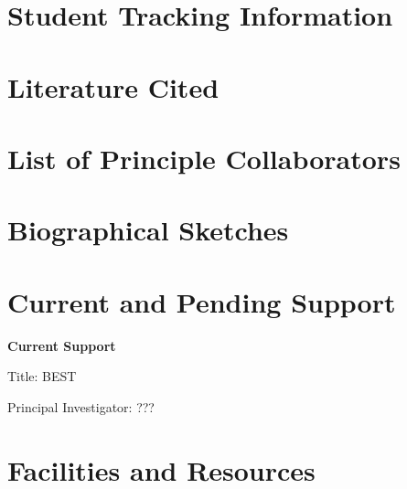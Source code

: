 \documentclass{DOEproposal}
\begin{document}
	
	\section{Student Tracking Information}
        \label{sec:staffing}
        
    \newpage




    \section{Literature Cited}
        \label{sec:references}
        
    \newpage

	\section{List of Principle Collaborators}
        \label{sec:PC}
        
    \newpage

 
	
	\section{Biographical Sketches}
        \label{sec:biosketches}
        
    
	\section{Current and Pending Support}
        \label{sec:grants}
	
	{\bf Current Support}

	\noindent
	Title: BEST
	
	\noindent
	Principal Investigator: ???  

	\section{Facilities and Resources}
        \label{sec:facres}
	
\end{document}
